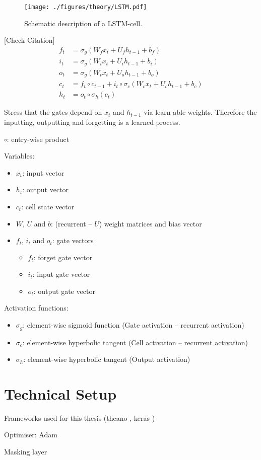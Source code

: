 \begin{figure}[t]
  \centering
  \texttt{[image: ./figures/theory/LSTM.pdf]}
  \caption{Schematic description of a LSTM-cell.}
  \label{fig:schematic_lstm}
\end{figure}

[Check Citation]\cite{lstm}
\begin{align*}
  f_t &= \sigma_g( W_f x_t + U_f h_{t-1} + b_f) \\
  i_t &= \sigma_g( W_i x_t + U_i h_{t-1} + b_i) \\
  o_t &= \sigma_g( W_t x_t + U_o h_{t-1} + b_o) \\
  c_t &= f_t \circ c_{t-1} + i_t \circ \sigma_c(W_c x_t + U_c h_{t-1} + b_c) \\
  h_t &= o_t \circ \sigma_h(c_t)
\end{align*}

Stress that the gates depend on $x_t$ and $h_{t-1}$ via learn-able weights.
Therefore the inputting, outputting and forgetting is a learned process.

$\circ$: entry-wise product


Variables:
\begin{itemize}
\item $x_t$: input vector
\item $h_t$: output vector
\item $c_t$: cell state vector
\item $W$, $U$ and $b$: (recurrent -- $U$) weight matrices and bias vector
\item $f_t$, $i_t$ and $o_t$: gate vectors
  \begin{itemize}
  \item $f_t$: forget gate vector
  \item $i_t$: input gate vector
  \item $o_t$: output gate vector
  \end{itemize}
\end{itemize}

Activation functions:
\begin{itemize}
\item $\sigma_g$: element-wise sigmoid function (Gate activation -- recurrent
  activation)
\item $\sigma_c$: element-wise hyperbolic tangent (Cell activation -- recurrent
  activation)
\item $\sigma_h$: element-wise hyperbolic tangent (Output activation)
\end{itemize}


\section{Technical Setup}
\label{sec:tech_setup}

Frameworks used for this thesis (theano \cite{theano}, keras \cite{keras})

Optimiser: Adam

Masking layer


